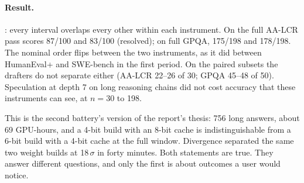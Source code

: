 \begin{table}[t]
\centering\small
\caption{AA-LCR judging. The same 260 answers were scored by two independent LLM judges using the
benchmark's equality-checker prompt; a third judge ruled on the 11 disagreements. Identifiers are as
recorded in the artifacts.}\label{tab:judges}
\end{table}

\paragraph{Result.} : every interval overlaps every other within each instrument.
On the full AA-LCR pass \Qfour{} scores 87/100 and \Qsix{} 83/100 (resolved); on full GPQA, 175/198 and
178/198. The nominal order flips between the two instruments, as it did between HumanEval+ and
SWE-bench in the first period. On the paired subsets the drafters do not separate either (AA-LCR
22--26 of 30; GPQA 45--48 of 50). Speculation at depth 7 on long reasoning chains did not cost
accuracy that these instruments can see, at $n=30$ to 198.

This is the second battery's version of the report's thesis: 756 long answers, about 69 GPU-hours,
and a 4-bit build with an 8-bit cache is indistinguishable from a 6-bit build with a 4-bit cache at
the full window. Divergence separated the same two weight builds at 18\,$\sigma$ in forty minutes.
Both statements are true. They answer different questions, and only the first is about outcomes a
user would notice.

